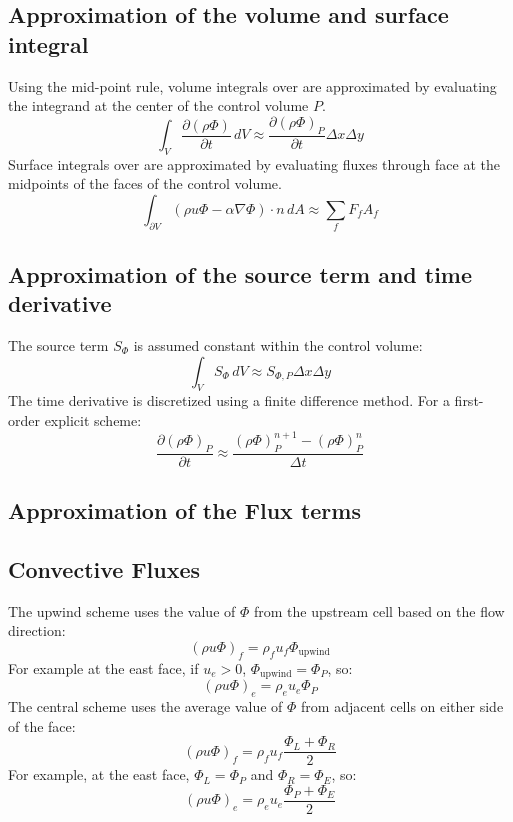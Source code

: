\documentclass{article}
\begin{document}
\subsection{Approximation of the volume and surface integral}

Using the mid-point rule, volume integrals over are approximated by evaluating the integrand at the center of the control volume \( P \).
\[
\int_V \frac{\partial (\rho \Phi)}{\partial t} \, dV \approx \frac{\partial (\rho \Phi)_P}{\partial t} \Delta x \Delta y
\]
Surface integrals over are approximated by evaluating fluxes through face at the midpoints of the faces of the control volume.
\[
\int_{\partial V} \left( \rho u \Phi - \alpha \nabla \Phi \right) \cdot n \, dA \approx \sum_f F_f A_f
\]


\subsection{Approximation of the source term and time derivative}

The source term \( S_\Phi \) is assumed constant within the control volume:
\[
\int_V S_\Phi \, dV \approx S_{\Phi, P} \Delta x \Delta y
\]
The time derivative is discretized using a finite difference method. For a first-order explicit scheme:
\[
\frac{\partial (\rho \Phi)_P}{\partial t} \approx 
\frac{(\rho \Phi)_P^{n+1} - (\rho \Phi)_P^n}{\Delta t}
\]

\subsection{Approximation of the Flux terms}

\subsection*{Convective Fluxes}

The upwind scheme uses the value of $\Phi$ from the upstream cell based on the flow direction:
\begin{equation}
(\rho u \Phi)_f = \rho_f u_f \Phi_{\text{upwind}}
\end{equation}
For example at the east face, if $u_e > 0$, $\Phi_{\text{upwind}} = \Phi_P$, so:
\begin{equation}
  (\rho u \Phi)_e = \rho_e u_e \Phi_P 
  \end{equation}
The central scheme uses the average value of $\Phi$ from adjacent cells on either side of the face:
\begin{equation}
(\rho u \Phi)_f = \rho_f u_f \frac{\Phi_L + \Phi_R}{2}
\end{equation}
For example, at the east face, $\Phi_L = \Phi_P$ and $\Phi_R = \Phi_E$, so:
\begin{equation}
(\rho u \Phi)_e = \rho_e u_e \frac{\Phi_P + \Phi_E}{2}
\end{equation}
\end{document}

